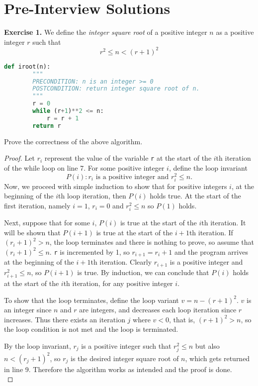 \documentclass[11pt]{article}
\begin{document}
    \section*{Pre-Interview Solutions}
    \textbf{Exercise 1.} We define the \textit{integer square root} of a positive integer \(n\) as a positive integer \(r\) such that
    \[
        r^2 \leq n < (r + 1)^2
    \]
    \begin{lstlisting}[language=Python]
        def iroot(n):
        """
        PRECONDITION: n is an integer >= 0
        POSTCONDITION: return integer square root of n.
        """
        r = 0
        while (r+1)**2 <= n:
            r = r + 1
        return r
    \end{lstlisting}
    Prove the correctness of the above algorithm.

    \begin{proof}
        Let \(r_i\) represent the value of the variable \texttt{r} at the start of the \(i\)th iteration of the while loop on line 7. For some positive integer \(i\), define the loop invariant
        \[
            P(i): r_i \text{ is a positive integer and } r_i^2 \leq n.
        \]
        Now, we proceed with simple induction to show that for positive integers \(i\), at the beginning of the \(i\)th loop iteration, then \(P(i)\) holds true. At the start of the first iteration, namely \(i = 1\), \(r_i = 0\) and \(r_i^2 \leq n\) so \(P(1)\) holds.

        \medbreak

        \noindent Next, suppose that for some \(i\), \(P(i)\) is true at the start of the \(i\)th iteration. It will be shown that \(P(i + 1)\) is true at the start of the \(i + 1\)th iteration. If \((r_i + 1)^2 > n\), the loop terminates and there is nothing to prove, so assume that \((r_i + 1)^2 \leq n\). \texttt{r} is incremented by 1, so \(r_{i+1} = r_i + 1\) and the program arrives at the beginning of the \(i + 1\)th iteration. Clearly \(r_{i+1}\) is a positive integer and \(r_{i+1}^2 \leq n\), so \(P(i+1)\) is true. By induction, we can conclude that \(P(i)\) holds at the start of the \(i\)th iteration, for any positive integer \(i\).

        \medbreak

        \noindent To show that the loop terminates, define the loop variant \(v = n - (r + 1)^2\). \(v\) is an integer since \(n\) and \(r\) are integers, and decreases each loop iteration since \(r\) increases. Thus there exists an iteration \(j\) where \(v < 0\), that is, \((r + 1)^2 > n\), so the loop condition is not met and the loop is terminated.

        \medbreak

        \noindent By the loop invariant, \(r_j\) is a positive integer such that \(r_j^2 \leq n\) but also \(n < (r_j + 1)^2\), so \(r_j\) is the desired integer square root of \(n\), which gets returned in line 9. Therefore the algorithm works as intended and the proof is done. \\
    \end{proof}
\end{document}
